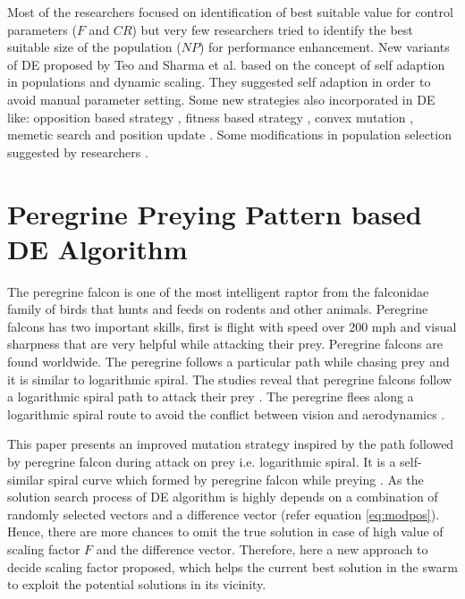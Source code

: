 \documentclass{svproc}
\begin{document}
Most of the researchers focused on identification of best suitable value for control parameters ($F$ and $CR$) but very few researchers tried to identify the best suitable size of the population ($NP$) for performance enhancement. New variants of DE proposed by Teo \cite{teo2006exploring} and Sharma et al. \cite{sharma2012dynamic} based on the concept of self adaption in populations and dynamic scaling. They suggested self adaption in order to avoid manual parameter setting. Some new strategies also incorporated in DE like: opposition based strategy \cite{kumar2014opposition}, fitness based strategy \cite{sharma2012fitness}, convex mutation \cite{sharma2016asynchronous}, memetic search \cite{kumar2014memetic} and position update \cite{jain2017improved}. Some modifications in population selection suggested by researchers \cite{sharma2015modified}.

\section{Peregrine Preying Pattern based DE Algorithm} \label{P3DE}
The peregrine falcon is one of the most intelligent raptor from the falconidae family of birds that hunts and feeds on rodents and other animals. Peregrine falcons has two important skills, first is flight with speed over 200 mph and visual sharpness that are very helpful while attacking their prey. Peregrine falcons are found worldwide. The peregrine follows a particular path while chasing prey and it is similar to logarithmic spiral. The studies reveal that peregrine falcons follow a logarithmic spiral path to attack their prey \cite{lorimer2006curved, ls2018}. The peregrine flees along a logarithmic spiral route to avoid the conflict between vision and aerodynamics \cite{tucker2000curved}.

This paper presents an improved mutation strategy inspired by the path followed by peregrine falcon during attack on prey i.e. logarithmic spiral. It is a self-similar spiral curve which formed by peregrine falcon while preying \cite{ls2018}. As the solution search process of DE algorithm is highly depends on a combination of randomly selected vectors and a difference vector (refer equation \ref{eq:modpos}). Hence, there are more chances to omit the true solution in case of high value of scaling factor $F$ and the difference vector. Therefore, here a new approach to decide scaling factor proposed, which helps the current best solution in the swarm to exploit the potential solutions in its vicinity.
\end{document}
